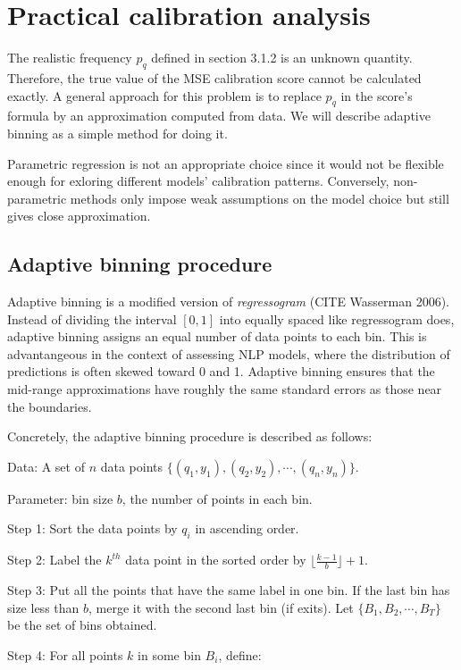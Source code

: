 \section{Practical calibration analysis}

The realistic frequency $p_q$ defined in section 3.1.2 is an unknown quantity. Therefore, the true value of the MSE calibration score cannot be calculated exactly. A general approach for this problem is to replace $p_q$ in the score's formula by an approximation computed from data. We will describe adaptive binning as a simple method for doing it.

Parametric regression is not an appropriate choice since it would not be flexible enough for exloring different models' calibration patterns. Conversely, non-parametric methods only impose weak assumptions on the model choice but still gives close approximation.

\subsection{Adaptive binning procedure}

Adaptive binning is a modified version of \textit{regressogram} (CITE Wasserman 2006). Instead of dividing the interval $[0, 1]$ into equally spaced like regressogram does, adaptive binning assigns an equal number of data points to each bin. This is advantangeous in the context of assessing NLP models, where the distribution of predictions is often skewed toward 0 and 1. Adaptive binning ensures that the mid-range approximations have roughly the same standard errors as those near the boundaries.

Concretely, the adaptive binning procedure is described as follows:

Data: A set of $n$ data points $\{(q_1, y_1), (q_2, y_2), \cdots, (q_n, y_n)\}$.

Parameter: bin size $b$, the number of points in each bin.

Step 1: Sort the data points by $q_i$ in ascending order.

Step 2: Label the $k^{th}$ data point in the sorted order by $\lfloor \frac{k - 1}{b}\rfloor + 1$.

Step 3: Put all the points that have the same label in one bin. If the last bin has size less than $b$, merge it with the second last bin (if exits). Let $\{B_1, B_2, \cdots, B_T\}$ be the set of bins obtained.  

Step 4: For all points $k$ in some bin $B_i$, define:

